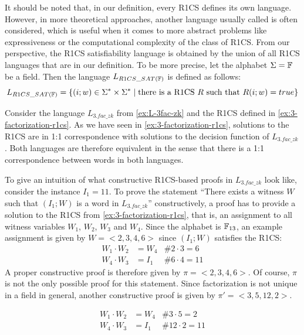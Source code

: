 \begin{remark}[R1CS satisfiability]\label{r1cs-satisfiability}  It should be noted that, in our definition, every R1CS defines its own language. However,  in more theoretical approaches, another language usually called  is often considered, which is useful when it comes to more abstract problems like expressiveness or the computational complexity of the class of  R1CS. From our perspective, the R1CS satisfiability language is obtained by the union of all R1CS languages that are in our definition. To be more precise, let the alphabet $\Sigma=\mathbb{F}$ be a field. Then the language $L_{R1CS\_SAT(\mathbb{F})}$ is defined as follows:
$$
L_{R1CS\_SAT(\mathbb{F})} = \{(i;w)\in \Sigma^*\times \Sigma^*\;|\; \text{there is a R1CS $R$ such that } R(i;w)=true  \}
$$
\end{remark}
\begin{example}[3-Factorization]
\label{ex:3-fac-R1CS-constr-proof}
Consider the language $L_{3.fac\_zk}$ from \examplename{} \ref{ex:L-3fac-zk} and the R1CS defined in \examplename{} \ref{ex:3-factorization-r1cs}. As we have seen in \ref{ex:3-factorization-r1cs}, solutions to the R1CS are in 1:1 correspondence with solutions to the decision function of $L_{3.fac\_zk}$. Both languages are therefore equivalent in the sense that there is a 1:1 correspondence between words in both languages.

To give an intuition of what constructive R1CS-based proofs in $L_{3.fac\_zk}$ look like, consider the instance $I_1= 11$. To prove the statement ``There exists a witness $W$ such that $(I_1;W)$ is a word in $L_{3.fac\_zk}$'' constructively, a proof has to provide a solution to the R1CS from \examplename{} \ref{ex:3-factorization-r1cs}, that is, an assignment to all witness variables $W_1$, $W_2$, $W_3$ and $W_4$. Since the alphabet is $\mathbb{F}_{13}$, an example assignment is given by
$W=<2,3,4,6>$ since $(I_1;W)$ satisfies the R1CS:
\begin{align*}
W_1 \cdot W_2 &= W_4 & \text{\# } 2\cdot 3 = 6\\
W_4 \cdot W_3 &= I_1 & \text{\# } 6\cdot 4 = 11
\end{align*}
A proper constructive proof is therefore given by $\pi=<2,3,4,6>$. Of course, $\pi$ is not the only possible proof for this statement. Since factorization is not unique in a field in general, another constructive proof is given by $\pi'=<3,5,12,2>$. 

\begin{align*}
W_1 \cdot W_2 &= W_4 & \text{\# } 3\cdot 5 = 2\\
W_4 \cdot W_3 &= I_1 & \text{\# } 12\cdot 2 = 11
\end{align*}

\end{example}

